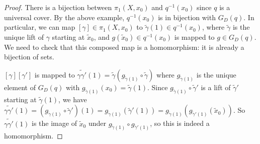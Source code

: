 \begin{proof}
	There is a bijection between \( \pi_1(X, x_0) \) and \( q^{-1}(x_0) \) since \( q \) is a universal cover.
	By the above example, \( q^{-1}(x_0) \) is in bijection with \( G_D(q) \).
	In particular, we can map \( [\gamma] \in \pi_1(X,x_0) \) to \( \widetilde \gamma(1) \in q^{-1}(x_0) \), where \( \widetilde \gamma \) is the unique lift of \( \gamma \) starting at \( \widetilde x_0 \), and \( g(\widetilde x_0) \in q^{-1}(x_0) \) is mapped to \( g \in G_D(q) \).
	We need to check that this composed map is a homomorphism: it is already a bijection of sets.

	\( [\gamma][\gamma'] \) is mapped to \( \widetilde{\gamma\gamma'}(1) = \widetilde \gamma (g_{\widetilde \gamma(1)} \circ \widetilde \gamma) \) where \( g_{\widetilde\gamma(1)} \) is the unique element of \( G_D(q) \) with \( g_{\widetilde\gamma(1)}(x_0) = \widetilde \gamma(1) \).
	Since \( g_{\widetilde\gamma(1)} \circ \widetilde\gamma' \) is a lift of \( \widetilde \gamma' \) starting at \( \widetilde \gamma(1) \), we have \( \widetilde{\gamma\gamma'}(1) = (g_{\widetilde\gamma(1)} \circ \widetilde\gamma')(1) = g_{\widetilde\gamma(1)}(\widetilde\gamma'(1)) = g_{\widetilde\gamma(1)}(g_{\widetilde\gamma'(1)}(\widetilde x_0)) \).
	So \( \widetilde{\gamma\gamma'}(1) \) is the image of \( \widetilde x_0 \) under \( g_{\widetilde\gamma(1)} \circ g_{\widetilde\gamma'(1)} \), so this is indeed a homomorphism.
\end{proof}

